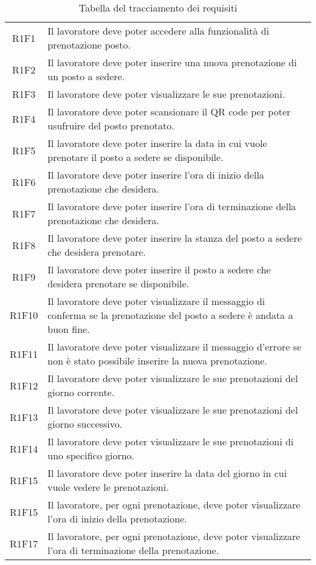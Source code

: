 \begin{table}[h]%
	\centering
	\begin{tabularx}{\textwidth}{c X}
		\hline	
		\rowcolor{giallo}
		\intest{Codice} &  \intest{Descrizione} \\	
		\hline			
		R1F1 & Il lavoratore deve poter accedere alla funzionalità di prenotazione posto.\\
		R1F2 & Il lavoratore deve poter inserire una nuova prenotazione di un posto a sedere.\\
		R1F3 & Il lavoratore deve poter visualizzare le sue prenotazioni.\\
		R1F4 & Il lavoratore deve poter scansionare il \gls{QR code}\ap{[g]} per poter usufruire del posto prenotato.\\
		R1F5 & Il lavoratore deve poter inserire la data in cui vuole prenotare il posto a sedere se disponibile.\\
		R1F6 & Il lavoratore deve poter inserire l'ora di inizio della prenotazione che desidera.\\
		R1F7 & Il lavoratore deve poter inserire l'ora di terminazione della prenotazione che desidera.\\
		R1F8 & Il lavoratore deve poter inserire la stanza del posto a sedere che desidera prenotare.\\
		R1F9 & Il lavoratore deve poter inserire il posto a sedere che desidera prenotare se disponibile.\\
		R1F10 & Il lavoratore deve poter visualizzare il messaggio di conferma se la prenotazione del posto a sedere è andata a buon fine.\\
		R1F11 & Il lavoratore deve poter visualizzare il messaggio d'errore se non è stato possibile inserire la nuova prenotazione.\\
		R1F12 & Il lavoratore deve poter visualizzare le sue prenotazioni del giorno corrente.\\
		R1F13 & Il lavoratore deve poter visualizzare le sue prenotazioni del giorno successivo.\\
		R1F14 & Il lavoratore deve poter visualizzare le sue prenotazioni di uno specifico giorno.\\
		R1F15 & Il lavoratore deve poter inserire la data del giorno in cui vuole vedere le prenotazioni.\\
		R1F15 & Il lavoratore, per ogni prenotazione, deve poter visualizzare l'ora di inizio della prenotazione.\\
		R1F17 & Il lavoratore, per ogni prenotazione, deve poter visualizzare l'ora di terminazione della prenotazione.\\	
		\hline	
	\end{tabularx} \hbox{}
	\caption{Tabella del tracciamento dei requisiti}
\end{table}%
\\

